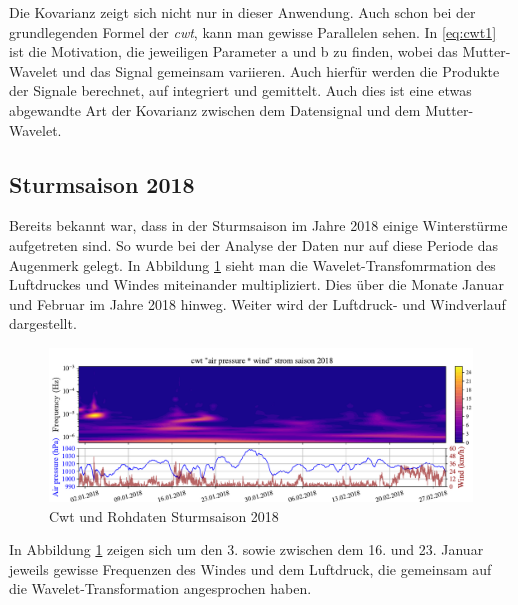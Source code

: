 \begin{refsection}
Die Kovarianz zeigt sich nicht nur in dieser Anwendung. Auch schon bei der grundlegenden Formel der \textit{cwt}, kann man gewisse Parallelen sehen. 
In \ref{eq:cwt1} ist die Motivation, die jeweiligen Parameter a und b zu finden, wobei das Mutter-Wavelet und das Signal gemeinsam variieren.
Auch hierfür werden die Produkte der Signale berechnet, auf integriert und gemittelt.
Auch dies ist eine etwas abgewandte Art der Kovarianz zwischen dem Datensignal und dem Mutter-Wavelet.
 
\subsection{Sturmsaison 2018}
Bereits bekannt war, dass in der Sturmsaison im Jahre 2018 einige Winterstürme aufgetreten sind.
So wurde bei der Analyse der Daten nur auf diese Periode das Augenmerk gelegt. 
In Abbildung \ref{fig:cwt_storm} \space sieht man die Wavelet-Transfomrmation des Luftdruckes und Windes miteinander multipliziert.
Dies über die Monate Januar und Februar im Jahre 2018 hinweg.
Weiter wird der Luftdruck- und Windverlauf dargestellt.
 
\begin{figure}[b]
	\centering
	\includegraphics[width=1\textwidth]{papers/wwt/images/storm_airp_wind.pdf}
	\caption{Cwt und Rohdaten Sturmsaison 2018}
	\label{fig:cwt_storm}
\end{figure}

In Abbildung \ref{fig:cwt_storm} \space zeigen sich um den 3. sowie zwischen dem 16. und 23. Januar jeweils gewisse Frequenzen des Windes und dem Luftdruck, die gemeinsam auf die Wavelet-Transformation angesprochen haben.


\end{refsection}
